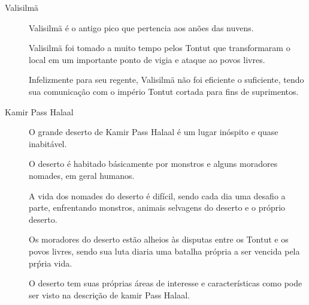 \begin{description}
\item[Valisilm\"a]
Valisilm\"a \'e o antigo pico que pertencia aos an\~oes das nuvens.

Valisilm\"a foi tomado a muito tempo pelos Tontut que transformaram o
local em um importante ponto de vigia e ataque ao povos livres.

Infelizmente para seu regente, Valisilm\"a n\~ao foi eficiente o
suficiente, tendo sua comunica\c{c}\~ao com o imp\'erio Tontut cortada
para fins de suprimentos.
\item[Kamir Pass Halaal]
O grande deserto de Kamir Pass Halaal \'e
um lugar in\'ospito e quase inabit\'avel.

O deserto \'e habitado b\'asicamente por monstros e alguns moradores
nomades, em geral humanos.

A vida dos nomades do deserto \'e dif\'icil, sendo cada dia uma desafio
a parte, enfrentando monstros, animais selvagens do deserto e o
pr\'oprio deserto.

Os moradores do deserto est\~ao alheios \`as disputas entre os Tontut
e os povos livres, sendo sua luta diaria uma batalha pr\'opria a ser
vencida pela pr\'pria vida.

O deserto tem suas pr\'oprias \'areas de interesse e caracter\'isticas como
pode ser visto na descri\c{c}\~ao de kamir Pass Halaal.
\end{description}
